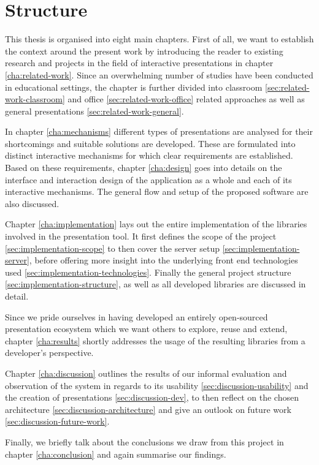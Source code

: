 \section{Structure}

This thesis is organised into eight main chapters. First of all, we want to establish the context around the present work by introducing the reader to existing research and projects in the field of interactive presentations in chapter \ref{cha:related-work}. Since an overwhelming number of studies have been conducted in educational settings, the chapter is further divided into classroom \ref{sec:related-work-classroom} and office \ref{sec:related-work-office} related approaches as well as general presentations \ref{sec:related-work-general}.

In chapter \ref{cha:mechanisms} different types of presentations are analysed for their shortcomings and suitable solutions are developed. These are formulated into distinct interactive mechanisms for which clear requirements are established.
Based on these requirements, chapter \ref{cha:design} goes into details on the interface and interaction design of the application as a whole and each of its interactive mechanisms. The general flow and setup of the proposed software are also discussed.

Chapter \ref{cha:implementation} lays out the entire implementation of the libraries involved in the presentation tool. It first defines the scope of the project \ref{sec:implementation-scope} to then cover the server setup \ref{sec:implementation-server}, before offering more insight into the underlying front end technologies used \ref{sec:implementation-technologies}. Finally the general project structure \ref{sec:implementation-structure}, as well as all developed libraries are discussed in detail.

Since we pride ourselves in having developed an entirely open-sourced presentation ecosystem which we want others to explore, reuse and extend, chapter \ref{cha:results} shortly addresses the usage of the resulting libraries from a developer's perspective.

Chapter \ref{cha:discussion} outlines the results of our informal evaluation and observation of the system in regards to its usability \ref{sec:discussion-usability} and the creation of presentations \ref{sec:discussion-dev}, to then reflect on the chosen architecture \ref{sec:discussion-architecture} and give an outlook on future work \ref{sec:discussion-future-work}.

Finally, we briefly talk about the conclusions we draw from this project in chapter \ref{cha:conclusion} and again summarise our findings.